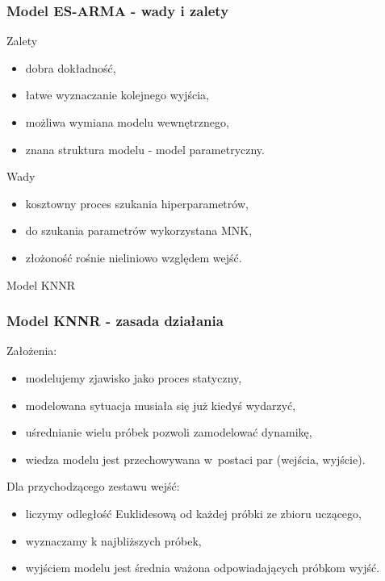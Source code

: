 \documentclass{beamer}
\begin{document}
\begin{frame}
  \frametitle{Model ES-ARMA - wady i zalety}
  \begin{exampleblock}{Zalety}
    \begin{itemize}
      \item dobra dokładność,
      \item łatwe wyznaczanie kolejnego wyjścia,
      \item możliwa wymiana modelu wewnętrznego,
      \item znana struktura modelu - model parametryczny.
    \end{itemize}
  \end{exampleblock}
  \begin{alertblock}{Wady}
    \begin{itemize}
      \item kosztowny proces szukania hiperparametrów,
      \item do szukania parametrów wykorzystana MNK,
      \item złożoność rośnie nieliniowo względem wejść.
    \end{itemize}
  \end{alertblock}
\end{frame}

\begin{frame}[plain,c]
  \begin{center}
    \Huge Model KNNR
  \end{center}
\end{frame}

\begin{frame}
  \frametitle{Model KNNR - zasada działania}
  \begin{block}{Założenia:}
    \begin{itemize}
      \item modelujemy zjawisko jako proces statyczny,
      \item modelowana sytuacja musiała się już kiedyś wydarzyć,
      \item uśrednianie wielu próbek pozwoli zamodelować dynamikę,
      \item wiedza modelu jest przechowywana w~postaci par (wejścia, wyjście).
    \end{itemize}
  \end{block}

  \begin{block}{Dla przychodzącego zestawu wejść:}
    \begin{itemize}
      \item liczymy odległość Euklidesową od każdej próbki ze zbioru uczącego,
      \item wyznaczamy k najbliższych próbek,
      \item wyjściem modelu jest średnia ważona odpowiadających próbkom wyjść. 
    \end{itemize}
  \end{block}
\end{frame}
\end{document}

